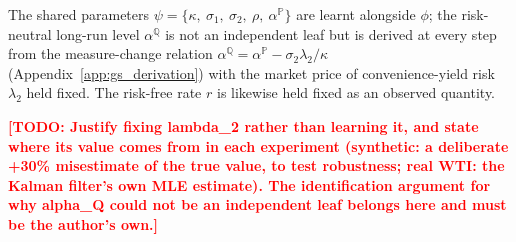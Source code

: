 \documentclass[11pt, a4paper]{article}
\newcommand{\todo}[1]{\textcolor{red}{\textbf{[TODO: #1]}}}
\begin{document}
The shared parameters $\psi = \{\kappa,\ \sigma_1,\ \sigma_2,\ \rho,\
\alpha^{\mathbb{P}}\}$ are learnt alongside $\phi$; the risk-neutral long-run
level $\alpha^{\mathbb{Q}}$ is not an independent leaf but is derived at every
step from the measure-change relation
$\alpha^{\mathbb{Q}} = \alpha^{\mathbb{P}} - \sigma_2\lambda_2/\kappa$
(Appendix~\ref{app:gs_derivation}) with the market price of convenience-yield
risk $\lambda_2$ held fixed. The risk-free rate $r$ is likewise held fixed as an
observed quantity.

\todo{Justify fixing lambda\_2 rather than learning it, and state where its value
  comes from in each experiment (synthetic: a deliberate +30\% misestimate of
  the true value, to test robustness; real WTI: the Kalman filter's own MLE
  estimate). The identification argument for why alpha\_Q could not be an
  independent leaf belongs here and must be the author's own.}

\end{document}
